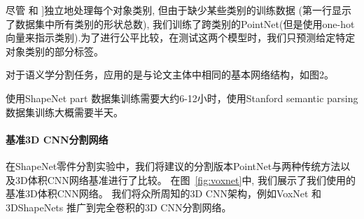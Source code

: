 尽管 \cite{Wu2014248} 和 \cite{Yi16} ]独立地处理每个对象类别, 但由于缺少某些类别的训练数据 (第一行显示了数据集中所有类别的形状总数), 我们训练了跨类别的PointNet(但是使用one-hot向量来指示类别).为了进行公平比较，在测试这两个模型时，我们只预测给定特定对象类别的部分标签。

对于语义学分割任务，应用的是与论文主体中相同的基本网络结构，如图2。

使用ShapeNet part 数据集训练需要大约6-12小时，使用Stanford semantic parsing数据集训练大概需要半天。

\paragraph{基准3D CNN分割网络}
在ShapeNet零件分割实验中，我们将建议的分割版本PointNet与两种传统方法以及3D体积CNN网络基准进行了比较。 在图~\ref{fig:voxnet}中, 我们展示了我们使用的基准3D体积CNN网络。 我们将众所周知的3D CNN架构，例如VoxNet \cite{maturana2015voxnet} 和 3DShapeNets \cite{wu20153d} 推广到完全卷积的3D CNN分割网络。


